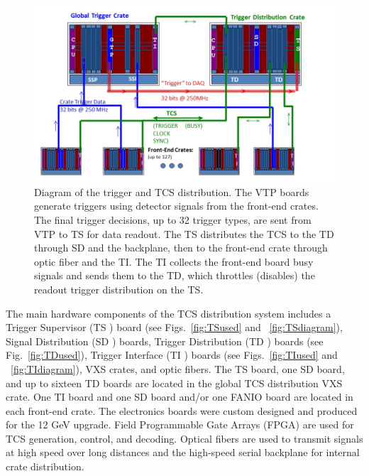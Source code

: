 \begin{figure}[hbt]
	\centering
	\includegraphics[width=1.0\columnwidth,keepaspectratio]{img/TCSdiagram.jpg}
	\caption{Diagram of the trigger and TCS distribution. The VTP boards generate triggers using detector signals from the front-end crates.  The final trigger decisions, up to 32 trigger types, are sent from VTP to TS for data readout.  The TS distributes the TCS to the TD through SD and the backplane, then to the front-end crate through optic fiber and the TI.  The TI collects the front-end board busy signals and sends them to the TD, which throttles (disables) the readout trigger distribution on the TS.}
	\label{fig:TCSdiagram}
\end{figure}


The main hardware components of the TCS distribution system includes a Trigger Supervisor (TS \cite{ts-ref}) board (see Figs.~\ref{fig:TSused} and ~\ref{fig:TSdiagram}), Signal Distribution (SD \cite{sd-ref}) boards, Trigger Distribution (TD \cite{titd-ref}) boards  (see Fig.~\ref{fig:TDused}), Trigger Interface (TI \cite{titd-ref}) boards  (see Figs.~\ref{fig:TIused} and ~\ref{fig:TIdiagram}), VXS crates, and optic fibers.  The TS board, one SD board, and up to sixteen TD boards are located in the global TCS distribution VXS crate.  One TI board and one SD board and/or one FANIO board are located in each front-end crate.  The electronics boards were custom designed and produced for the 12 GeV upgrade.  Field Programmable Gate Arrays (FPGA) are used for TCS generation, control, and decoding.  Optical fibers are used to transmit signals at high speed over long distances and the high-speed serial backplane for internal crate distribution.  

